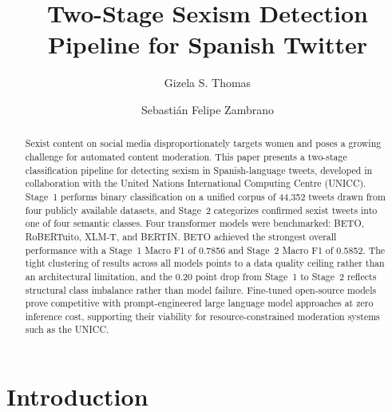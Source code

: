 \documentclass[runningheads]{llncs}
\begin{document}
\title{Two-Stage Sexism Detection Pipeline for Spanish Twitter}


\author{Gizela S. Thomas \and
 Sebasti\'{a}n Felipe Zambrano}



\maketitle

\begin{abstract}
Sexist content on social media disproportionately targets women and poses a growing
challenge for automated content moderation. This paper presents a two-stage
classification pipeline for detecting sexism in Spanish-language tweets, developed in
collaboration with the United Nations International Computing Centre (UNICC). Stage~1
performs binary classification on a unified corpus of 44,352 tweets drawn from four
publicly available datasets, and Stage~2
categorizes confirmed sexist tweets into one of four semantic classes. Four transformer
models were benchmarked: BETO, RoBERTuito, XLM-T, and BERTIN. BETO achieved
the strongest overall performance with a Stage~1 Macro F1 of 0.7856 and Stage~2 Macro
F1 of 0.5852. The tight clustering of results across all models points to a data quality
ceiling rather than an architectural limitation, and the 0.20 point drop from Stage~1 to
Stage~2 reflects structural class imbalance rather than model failure. Fine-tuned
open-source models prove competitive with prompt-engineered large language model
approaches at zero inference cost, supporting their viability for resource-constrained
moderation systems such as the UNICC.

\end{abstract}

\section{Introduction}
\end{document}
